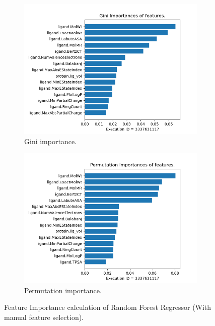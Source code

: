 \documentclass[11pt]{article}
\begin{document}
\begin{figure}
     \centering
     \begin{subfigure}[b]{0.45\textwidth}
         \centering
         \includegraphics[scale=0.45]{images/Gini_importance}
         \caption{Gini importance.}
        \label{fig:GiniImportanceLabel}
     \end{subfigure}
     \hfill
     \begin{subfigure}[b]{0.45\textwidth}
         \centering
         \includegraphics[scale=0.45]{images/Permutation_importance}
        \caption{Permutation importance.}
        \label{fig:PermutationImportanceLabel}
     \end{subfigure}
     \caption{Feature Importance calculation of Random Forest Regressor (With manual feature selection).}
     \label{fig:RFMFILable}
\end{figure}
\end{document}
